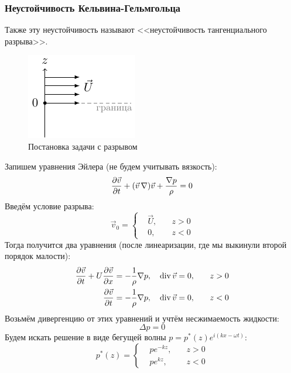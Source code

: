 \subsubsection{Неустойчивость Кельвина\hspace{0.5pt}-Гельмгольца}
Также эту неустойчивость называют <<неустойчивость тангенциального разрыва>>.
\begin{figure}[H]
    \centering
    \includegraphics[scale=1.5]{img/kelvin}
    \caption{Постановка задачи с разрывом}
    \label{fig:kelv-gelm}
\end{figure}
Запишем уравнения Эйлера (не будем учитывать вязкость):
\begin{equation}
    \pdv{\vec{v}}{t}+ (\vec{v}\,\nabla) \vec{v} + 
        \frac{\nabla p}{\rho}=0
\end{equation}
Введём условие разрыва:
\begin{equation}
    \vec{v}_0 = \left\{
    \begin{aligned}
        &\vec{U}, \quad &z>0 \\
        &0, \quad &z<0
    \end{aligned}\right.
\end{equation}
Тогда получится два уравнения (после линеаризации, 
где мы выкинули второй порядок малости):
\begin{gather}
    \begin{aligned}
     \pdv{\vec{v}}{t}+U\pdv{\vec{v}}{x} = -\frac{1}{\rho}\nabla p, 
     &\quad \operatorname{div} \vec{v} = 0, &\quad z>0\\
    \pdv{\vec{v}}{t} = -\frac{1}{\rho}\nabla p, 
                             &\quad \operatorname{div} \vec{v} = 0, &\quad z<0\\
    \end{aligned}
\end{gather}
Возьмём дивергенцию от этих уравнений и учтём несжимаемость жидкости:
\begin{equation}
    \Delta p = 0
\end{equation}
Будем искать решение в виде бегущей волны $p=p^*(z)e^{i(kx-\omega t)}$:
\begin{equation}
    p^*(z) = \left\{
    \begin{aligned}
        &p e^{-kz}, \quad &z>0\\        
        &p e^{kz}, \quad & z<0
    \end{aligned}
    \right.
\end{equation}
